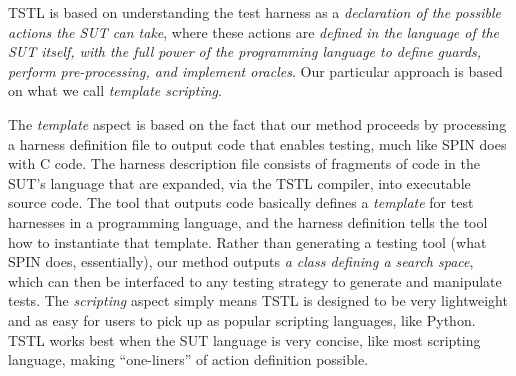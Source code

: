 TSTL is based on understanding the test harness as a \emph{declaration
  of the possible actions the SUT can take}, where these actions are
\emph{defined in the language of the SUT itself, with the full power
  of the programming language to define guards, perform
  pre-processing, and implement oracles}.  Our particular approach is
based on what we call \emph{template scripting}.

The \emph{template} aspect is based on the fact that our method
proceeds by processing a harness definition file to output code that
enables testing, much like SPIN does with C code.  The harness
description file consists of fragments of code in the SUT's language
that are expanded, via the TSTL compiler, into executable source code.
The tool that outputs code basically defines a \emph{template} for
test harnesses in a programming language, and the harness definition
tells the tool how to instantiate that template.  Rather
than generating a testing tool (what SPIN does, essentially), our method outputs \emph{a class
defining a search space}, which can then be interfaced to any testing
strategy to generate and manipulate tests.  The \emph{scripting} aspect simply means
TSTL is designed to be very lightweight and as easy for
users to pick up as popular scripting languages, like Python.  TSTL
works best when the SUT language is very
concise, like most scripting language, making ``one-liners'' of action definition possible.

